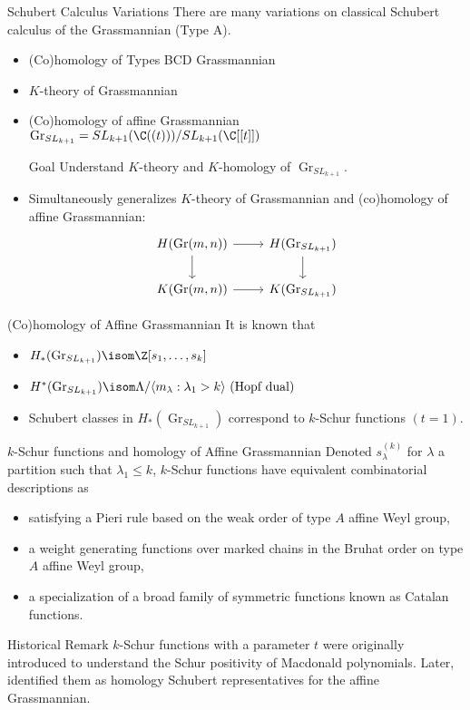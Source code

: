 \documentclass{beamer}
\DeclareMathOperator{\Gr}{Gr}
\newcommand{\sym}{\Lambda}
\begin{document}
\begin{frame}[fragile]{Schubert Calculus Variations}
    There are many variations on classical Schubert calculus of
    the Grassmannian (Type A).
  \begin{itemize}
  \item (Co)homology of Types BCD Grassmannian
  \item \(K\)-theory of Grassmannian
  \item (Co)homology of affine Grassmannian \(\Gr_{SL_{k+1}} = SL_{k+1}(\C((t)))/SL_{k+1}(\C[[t]])\)
    \begin{block}{Goal}
      Understand \(K\)-theory and \(K\)-homology of \(\Gr_{SL_{k+1}}\).
    \end{block}
  \item Simultaneously generalizes \(K\)-theory of Grassmannian and
    (co)homology of affine Grassmannian:
    \[
      \begin{tikzcd}
        H(\Gr(m,n)) \ar[d] \ar[r]& H(\Gr_{SL_{k+1}}) \ar[d] \\
        K(\Gr(m,n)) \ar[r] & K(\Gr_{SL_{k+1}})
      \end{tikzcd} 
    \]
  \end{itemize}
\end{frame}
\begin{frame}{(Co)homology of Affine Grassmannian}
  It is known that
  \begin{itemize}
  \item  \( H_*(\Gr_{SL_{k+1}}) \isom \Z[s_1, \ldots, s_k]\) 
  \item \(H^*(\Gr_{SL_{k+1}}) \isom \sym / \langle m_\lambda : \lambda_1 >
    k\rangle \text{ (Hopf dual) }\)
  \item Schubert classes in \(H_*(\Gr_{SL_{k+1}})\) correspond to
    \(k\)-Schur functions \((t=1)\). 
  \end{itemize}
\end{frame}
\begin{frame}{\(k\)-Schur functions and homology of Affine Grassmannian}
  Denoted \(s_\lambda^{(k)}\) for \(\lambda\) a partition such that
  \(\lambda_1 \leq k\), \(k\)-Schur functions have equivalent combinatorial
  descriptions as 
  \begin{itemize}
  \item satisfying a Pieri rule based on the weak order of type \(A\)
    affine Weyl group,
  \item a weight generating functions over marked chains in the Bruhat
    order on type \(A\) affine Weyl group,
  \item a specialization of a broad family of symmetric functions
    known as Catalan functions.
  \end{itemize}
  \begin{block}{Historical Remark}
    \(k\)-Schur functions with a parameter \(t\) were originally
    introduced to understand the Schur positivity of Macdonald
    polynomials. Later,~\cite{Lam} identified them as homology Schubert
    representatives for the affine Grassmannian.
  \end{block}
\end{frame}
\end{document}
